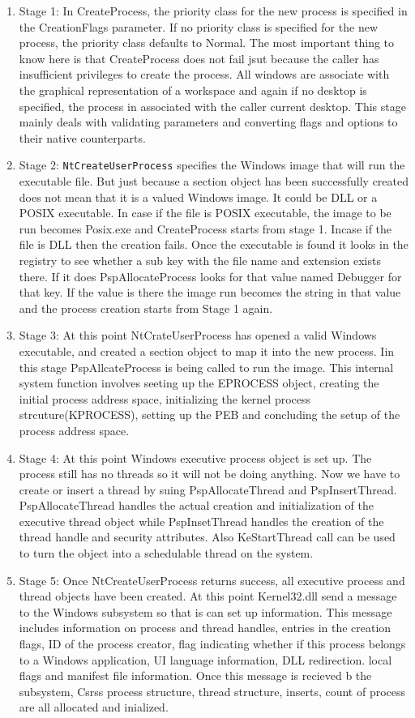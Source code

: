 \documentclass[letterpaper,10pt,draftclsnofoot,onecolumn]{IEEEtran}
\begin{document}
\begin{enumerate}
\item Stage 1: In CreateProcess, the priority class for the new process is specified in the CreationFlags parameter. If no priority class is specified for the new process, the priority class defaults to Normal. The most important thing to know here is that CreateProcess does not fail jsut because the caller has insufficient privileges to create the process. All windows are associate with the graphical representation of a workspace and again if no desktop is specified, the process in associated with the caller current desktop. This stage mainly deals with validating parameters and converting flags and options to their native counterparts.
\item Stage 2: \verb|NtCreateUserProcess| specifies the Windows image that will run the executable file. But just because a section object has been successfully created does not mean that it is a valued Windows image. It could be DLL or a POSIX executable. In case if the file is POSIX executable, the image to be run becomes Posix.exe and CreateProcess starts from stage 1. Incase if the file is DLL then the creation fails. Once the executable is found it looks in the registry to see whether a sub key with the file name and extension exists there. If it does PspAllocateProcess looks for that value named Debugger for that key. If the value is there the image run becomes the string in that value and the process creation starts from Stage 1 again.
\item Stage 3: At this point NtCrateUserProcess has opened a valid Windows executable, and created a section object to map it into the new process. Iin this stage PspAllcateProcess is being called to run the image. This internal system function involves seeting up the EPROCESS object, creating the initial process address space, initializing the kernel process strcuture(KPROCESS), setting up the PEB and concluding the setup of the process address space.
\item Stage 4: At this point Windows executive process object is set up. The process still has no threads so it will not be doing anything. Now we have to create or insert a thread by suing PspAllocateThread and PspInsertThread. PspAllocateThread handles the actual creation and initialization of the executive thread object while PspInsetThread handles the creation of the thread handle and security attributes. Also KeStartThread call can be used to turn the object into a schedulable thread on the system.
\item Stage 5: Once NtCreateUserProcess returns success, all executive process and thread objects have been created. At this point Kernel32.dll send a message to the Windows subsystem so that is can set up information. This message includes information on process and thread handles, entries in the creation flags, ID of the process creator, flag indicating whether if this process belongs to a Windows application, UI language information, DLL redirection. local flags and manifest file information. Once this message is recieved b the subsystem, Csrss process structure, thread structure, inserts, count of process are all allocated and inialized.

\end{enumerate}
\end{document}

